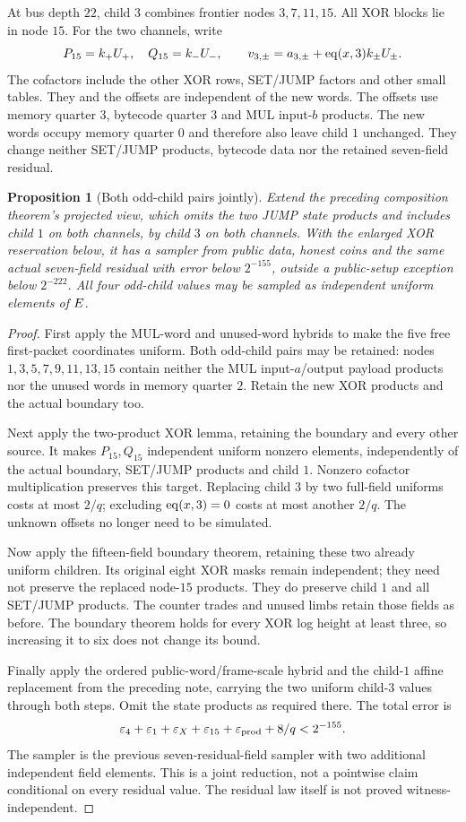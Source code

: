\documentclass[11pt]{article}
\newtheorem{proposition}{Proposition}
\begin{document}
At bus depth $22$, child $3$ combines frontier nodes $3,7,11,15$. All XOR blocks lie in node $15$. For the two channels, write
\[
 P_{15}=k_+U_+,\quad Q_{15}=k_-U_-,\qquad
 v_{3,\pm}=a_{3,\pm}+\operatorname{eq}(x,3)k_\pm U_\pm.
\]
The cofactors include the other XOR rows, SET/JUMP factors and other small tables. They and the offsets are independent of the new words. The offsets use memory quarter $3$, bytecode quarter $3$ and MUL input-$b$ products. The new words occupy memory quarter $0$ and therefore also leave child $1$ unchanged. They change neither SET/JUMP products, bytecode data nor the retained seven-field residual.

\begin{proposition}[Both odd-child pairs jointly]
Extend the preceding composition theorem's projected view, which omits the two JUMP state products and includes child $1$ on both channels, by child $3$ on both channels. With the enlarged XOR reservation below, it has a sampler from public data, honest coins and the same actual seven-field residual with error below $2^{-155}$, outside a public-setup exception below $2^{-222}$. All four odd-child values may be sampled as independent uniform elements of $E$.
\end{proposition}
\begin{proof}
First apply the MUL-word and unused-word hybrids to make the five free first-packet coordinates uniform. Both odd-child pairs may be retained: nodes $1,3,5,7,9,11,13,15$ contain neither the MUL input-$a$/output payload products nor the unused words in memory quarter $2$. Retain the new XOR products and the actual boundary too.

Next apply the two-product XOR lemma, retaining the boundary and every other source. It makes $P_{15},Q_{15}$ independent uniform nonzero elements, independently of the actual boundary, SET/JUMP products and child $1$. Nonzero cofactor multiplication preserves this target. Replacing child $3$ by two full-field uniforms costs at most $2/q$; excluding $\operatorname{eq}(x,3)=0$ costs at most another $2/q$. The unknown offsets no longer need to be simulated.

Now apply the fifteen-field boundary theorem, retaining these two already uniform children. Its original eight XOR masks remain independent; they need not preserve the replaced node-$15$ products. They do preserve child $1$ and all SET/JUMP products. The counter trades and unused limbs retain those fields as before. The boundary theorem holds for every XOR log height at least three, so increasing it to six does not change its bound.

Finally apply the ordered public-word/frame-scale hybrid and the child-$1$ affine replacement from the preceding note, carrying the two uniform child-$3$ values through both steps. Omit the state products as required there. The total error is
\[
 \varepsilon_4+\varepsilon_1+\varepsilon_X+\varepsilon_{15}
       +\varepsilon_{\rm prod}+8/q<2^{-155}.
\]
The sampler is the previous seven-residual-field sampler with two additional independent field elements. This is a joint reduction, not a pointwise claim conditional on every residual value. The residual law itself is not proved witness-independent.
\end{proof}
\end{document}
